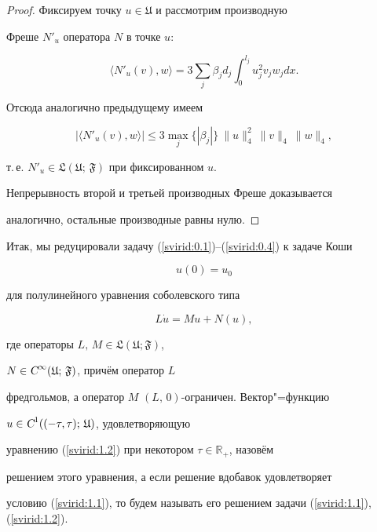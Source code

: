 \begin{proof}

Фиксируем точку $u\in\mathfrak{U}$ и рассмотрим про\-из\-вод\-ную

Фре\-ше $N'_u$ оператора $N$ в точке $u$:

$$\langle N'_u (v), w\rangle=3\sum\limits_j\beta_jd_j\int_0^{l_j}u_j^2v_jw_jdx.$$

Отсюда аналогично предыдущему имеем

$$|\langle N'_u(v), w\rangle|\leq 3 \max\limits_j \{|\beta_j|\} \ \|u\|_4^2 \ \|v\|_4 \ \|w\|_4,$$

т.\,е. $N'_u\in\mathfrak{L(U;\,F)}$ при фиксированном $u$.

Непрерывность второй и треть\-ей про\-из\-вод\-ных Фреше доказывается

аналогично, остальные производные рав\-ны нулю.

\end{proof}



Итак, мы редуцировали задачу (\ref{svirid:0.1})--(\ref{svirid:0.4}) к задаче Коши

\begin{equation}\label{svirid:1.1}

u(0)=u_0

\end{equation}

для полулинейного уравнения соболевского типа

\begin{equation}\label{svirid:1.2}

L\dot{u}=Mu+N(u),

\end{equation}

где операторы $L,\,M\in\mathfrak{L(U; F)}$,

$N\in\textsl{C}^\infty\mathfrak{(U;\,F)}$, причём оператор $L$

фред\-голь\-мов, а оператор $M$ $(L,\,0)$-ограничен. Вектор"=функцию

$u\in\textsl{C}^1((-\tau, \tau);\, \mathfrak{U})$, удов\-лет\-во\-ряю\-щую

уравнению (\ref{svirid:1.2}) при некотором $\tau\in\mathbb{R}_+$, назовём

ре\-ше\-ни\-ем этого уравнения, а если решение вдобавок удовлетворяет

условию (\ref{svirid:1.1}), то будем называть его решением задачи (\ref{svirid:1.1}), (\ref{svirid:1.2}).



